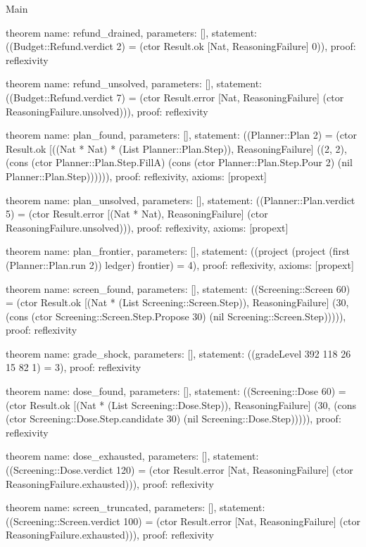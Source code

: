 \begin{lexlean}{Main}
\begin{semanticmodule}
theorem{
  name: refund_drained,
  parameters: [],
  statement: ((Budget::Refund.verdict 2) = (ctor Result.ok [Nat, ReasoningFailure] 0)),
  proof: reflexivity{}
}

theorem{
  name: refund_unsolved,
  parameters: [],
  statement: ((Budget::Refund.verdict 7) = (ctor Result.error [Nat, ReasoningFailure] (ctor ReasoningFailure.unsolved))),
  proof: reflexivity{}
}

theorem{
  name: plan_found,
  parameters: [],
  statement: ((Planner::Plan 2) = (ctor Result.ok [((Nat * Nat) * (List Planner::Plan.Step)), ReasoningFailure] ((2, 2), (cons (ctor Planner::Plan.Step.FillA) (cons (ctor Planner::Plan.Step.Pour 2) (nil Planner::Plan.Step)))))),
  proof: reflexivity{},
  axioms: [propext]
}

theorem{
  name: plan_unsolved,
  parameters: [],
  statement: ((Planner::Plan.verdict 5) = (ctor Result.error [(Nat * Nat), ReasoningFailure] (ctor ReasoningFailure.unsolved))),
  proof: reflexivity{},
  axioms: [propext]
}

theorem{
  name: plan_frontier,
  parameters: [],
  statement: ((project (project (first (Planner::Plan.run 2)) ledger) frontier) = 4),
  proof: reflexivity{},
  axioms: [propext]
}

theorem{
  name: screen_found,
  parameters: [],
  statement: ((Screening::Screen 60) = (ctor Result.ok [(Nat * (List Screening::Screen.Step)), ReasoningFailure] (30, (cons (ctor Screening::Screen.Step.Propose 30) (nil Screening::Screen.Step))))),
  proof: reflexivity{}
}

theorem{
  name: grade_shock,
  parameters: [],
  statement: ((gradeLevel 392 118 26 15 82 1) = 3),
  proof: reflexivity{}
}

theorem{
  name: dose_found,
  parameters: [],
  statement: ((Screening::Dose 60) = (ctor Result.ok [(Nat * (List Screening::Dose.Step)), ReasoningFailure] (30, (cons (ctor Screening::Dose.Step.candidate 30) (nil Screening::Dose.Step))))),
  proof: reflexivity{}
}

theorem{
  name: dose_exhausted,
  parameters: [],
  statement: ((Screening::Dose.verdict 120) = (ctor Result.error [Nat, ReasoningFailure] (ctor ReasoningFailure.exhausted))),
  proof: reflexivity{}
}

theorem{
  name: screen_truncated,
  parameters: [],
  statement: ((Screening::Screen.verdict 100) = (ctor Result.error [Nat, ReasoningFailure] (ctor ReasoningFailure.exhausted))),
  proof: reflexivity{}
}


\end{semanticmodule}
\end{lexlean}
